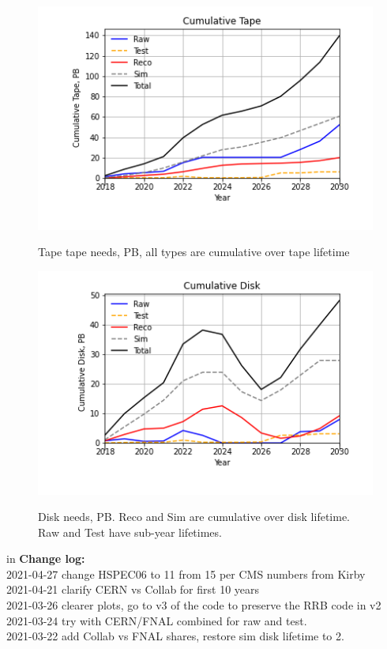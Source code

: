 \documentclass[12pt]{article}
\begin{document}
\begin{figure}
\centering\includegraphics[height=0.4\textwidth]{Cumulative-Tape.png}\label{CumulativeTape}
\caption{Tape tape needs, PB, all types are cumulative over tape lifetime}
\end{figure}
\begin{figure}
\centering\includegraphics[height=0.4\textwidth]{Cumulative-Disk}\label{CumulativeDisk}
\caption{Disk needs, PB.  Reco and Sim are cumulative over disk lifetime.  Raw and Test have sub-year lifetimes.}
\end{figure}
 in\pagebreak 
 {\bf Change log:}\\
2021-04-27 change HSPEC06 to 11 from 15 per CMS numbers from Kirby\\2021-04-21 clarify CERN vs Collab for first 10 years\\2021-03-26 clearer plots, go to v3 of the code to preserve the RRB code in v2\\2021-03-24 try with CERN/FNAL combined for raw and test.\\2021-03-22 add Collab vs FNAL shares, restore sim disk lifetime to 2.\\
\end{document}
